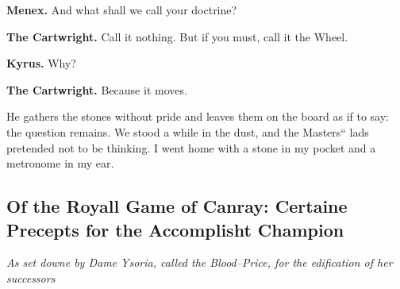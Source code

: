 \documentclass[11pt]{article}
\begin{document}
\noindent\textbf{Menex.} And what shall we call your doctrine?

\noindent\textbf{The Cartwright.} Call it nothing. But if you must, call it the Wheel.

\noindent\textbf{Kyrus.} Why?

\noindent\textbf{The Cartwright.} Because it moves.

\medskip
He gathers the stones without pride and leaves them on the board as if to say: the question remains. We stood a while in the dust, and the Masters`` lads pretended not to be thinking. I went home with a stone in my pocket and a metronome in my ear.
\clearpage

\subsection{Of the Royall Game of Canray: Certaine Precepts for the Accomplisht Champion}
\noindent\textit{As set downe by Dame Ysoria, called the Blood--Price, for the edification of her successors}
\end{document}

